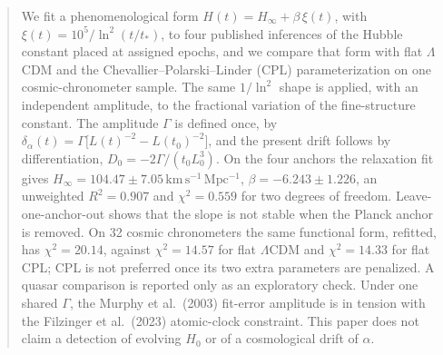 \begin{abstract}
We fit a phenomenological form $H(t)=H_{\infty}+\beta\,\xi(t)$, with $\xi(t)=10^{5}/\ln^{2}(t/t_{*})$, to four published inferences of the Hubble constant placed at assigned epochs, and we compare that form with flat $\Lambda$CDM and the Chevallier--Polarski--Linder (CPL) parameterization on one cosmic-chronometer sample.
The same $1/\ln^{2}$ shape is applied, with an independent amplitude, to the fractional variation of the fine-structure constant.
The amplitude $\Gamma$ is defined once, by $\delta_{\alpha}(t)=\Gamma\big[L(t)^{-2}-L(t_{0})^{-2}\big]$, and the present drift follows by differentiation, $D_{0}=-2\Gamma/(t_{0}L_{0}^{3})$.
On the four anchors the relaxation fit gives $H_{\infty}=104.47\pm7.05\,\mathrm{km\,s^{-1}\,Mpc^{-1}}$, $\beta=-6.243\pm1.226$, an unweighted $R^{2}=0.907$ and $\chi^{2}=0.559$ for two degrees of freedom.
Leave-one-anchor-out shows that the slope is not stable when the Planck anchor is removed.
On 32 cosmic chronometers the same functional form, refitted, has $\chi^{2}=20.14$, against $\chi^{2}=14.57$ for flat $\Lambda$CDM and $\chi^{2}=14.33$ for flat CPL; CPL is not preferred once its two extra parameters are penalized.
A quasar comparison is reported only as an exploratory check.
Under one shared $\Gamma$, the Murphy et al.\ (2003) fit-error amplitude is in tension with the Filzinger et al.\ (2023) atomic-clock constraint.
This paper does not claim a detection of evolving $H_{0}$ or of a cosmological drift of $\alpha$.
\end{abstract}
